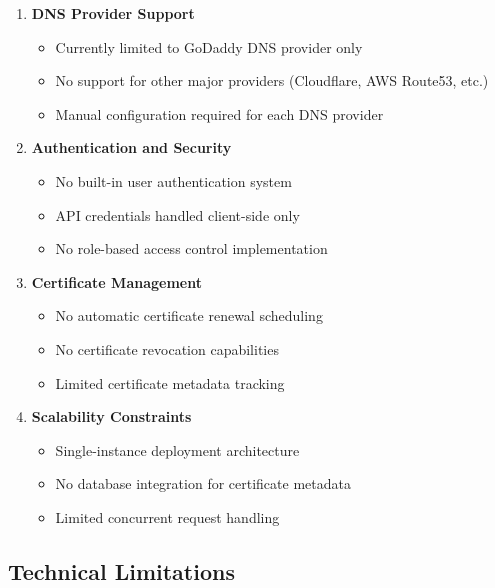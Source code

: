 \begin{enumerate}
    \item \textbf{DNS Provider Support}
    \begin{itemize}
        \item Currently limited to GoDaddy DNS provider only
        \item No support for other major providers (Cloudflare, AWS Route53, etc.)
        \item Manual configuration required for each DNS provider
    \end{itemize}
    
    \item \textbf{Authentication and Security}
    \begin{itemize}
        \item No built-in user authentication system
        \item API credentials handled client-side only
        \item No role-based access control implementation
    \end{itemize}
    
    \item \textbf{Certificate Management}
    \begin{itemize}
        \item No automatic certificate renewal scheduling
        \item No certificate revocation capabilities
        \item Limited certificate metadata tracking
    \end{itemize}
    
    \item \textbf{Scalability Constraints}
    \begin{itemize}
        \item Single-instance deployment architecture
        \item No database integration for certificate metadata
        \item Limited concurrent request handling
    \end{itemize}
\end{enumerate}

\subsection{Technical Limitations}

